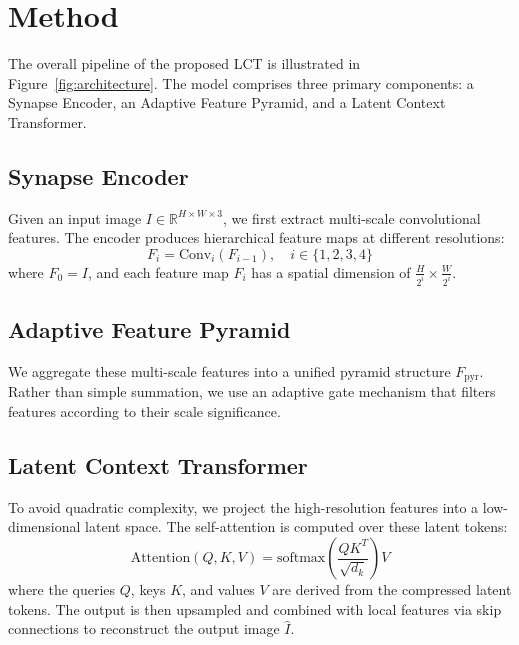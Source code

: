 \section{Method}
The overall pipeline of the proposed LCT is illustrated in Figure~\ref{fig:architecture}. The model comprises three primary components: a Synapse Encoder, an Adaptive Feature Pyramid, and a Latent Context Transformer.

\subsection{Synapse Encoder}
Given an input image $I \in \mathbb{R}^{H \times W \times 3}$, we first extract multi-scale convolutional features. The encoder produces hierarchical feature maps at different resolutions:
\begin{equation}
    F_i = \text{Conv}_i(F_{i-1}), \quad i \in \{1, 2, 3, 4\}
\end{equation}
where $F_0 = I$, and each feature map $F_i$ has a spatial dimension of $\frac{H}{2^i} \times \frac{W}{2^i}$.

\subsection{Adaptive Feature Pyramid}
We aggregate these multi-scale features into a unified pyramid structure $F_{\text{pyr}}$. Rather than simple summation, we use an adaptive gate mechanism that filters features according to their scale significance.

\subsection{Latent Context Transformer}
To avoid quadratic complexity, we project the high-resolution features into a low-dimensional latent space. The self-attention is computed over these latent tokens:
\begin{equation}
    \text{Attention}(Q, K, V) = \text{softmax}\left(\frac{Q K^T}{\sqrt{d_k}}\right) V
\end{equation}
where the queries $Q$, keys $K$, and values $V$ are derived from the compressed latent tokens. The output is then upsampled and combined with local features via skip connections to reconstruct the output image $\hat{I}$.

